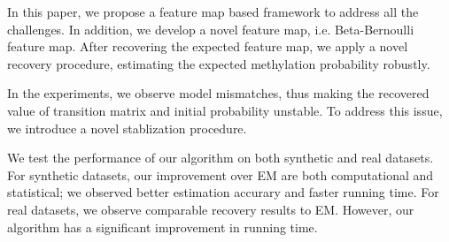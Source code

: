 In this paper, we propose a feature map based framework to address all the challenges. In addition, we develop a novel feature map, i.e. Beta-Bernoulli feature map. After recovering the expected feature map, we apply a novel recovery procedure, estimating the expected methylation probability robustly.

In the experiments, we observe model mismatches, thus making the recovered value of transition matrix and initial probability unstable. To address this issue, we introduce a novel stablization procedure.

We test the performance of our algorithm on both synthetic and real datasets. For synthetic datasets, our improvement over EM are both computational and statistical; we observed better estimation accurary and faster running time. For real datasets, we observe comparable recovery results to EM. However, our algorithm has a significant improvement in running time. %
